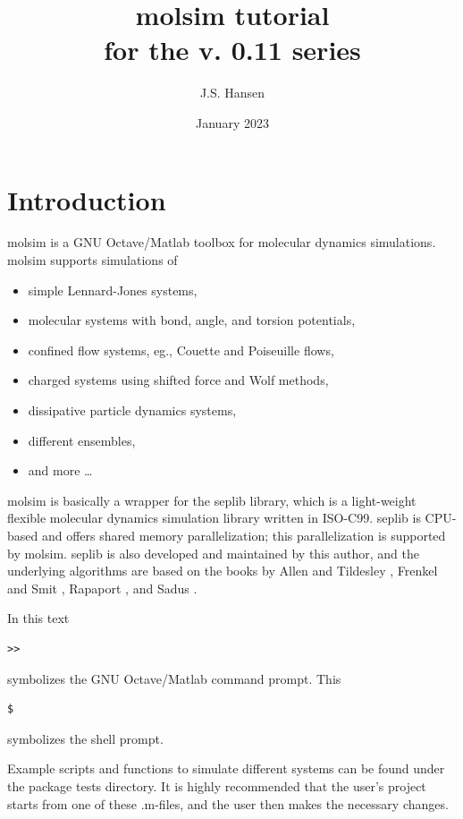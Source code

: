 \documentclass[11pt]{article}
\title{\textsf{molsim} tutorial \\ \bigskip \tiny{for the v. 0.11 series}}
\author{J.S. Hansen}
\date{January 2023}
\begin{document}
\maketitle

\section{Introduction}

\textsf{molsim} is a GNU Octave/Matlab toolbox for molecular dynamics
simulations. \textsf{molsim} supports simulations of
\begin{itemize}
\item simple Lennard-Jones systems,
\item molecular systems with bond, angle, and torsion potentials, 
\item confined flow systems, eg., Couette and Poiseuille flows,
\item charged systems using shifted force and Wolf methods,
\item dissipative particle dynamics systems,
\item different ensembles, 
\item and more \ldots
\end{itemize}

\bigskip
\noindent \textsf{molsim} is basically a wrapper for the \textsf{seplib}
library, which is a light-weight flexible molecular dynamics simulation library
written in ISO-C99. \textsf{seplib} is CPU-based and offers shared memory
parallelization; this parallelization is supported by
\textsf{molsim}. \textsf{seplib} is also developed and 
maintained by this
author, and the underlying algorithms are based on the books by Allen and
Tildesley \cite{AllenTildesley}, Frenkel and Smit \cite{FrenkelSmit}, Rapaport
\cite{Rapaport}, and Sadus \cite{Sadus}.

\bigskip
\noindent In this text
\begin{verbatim}
>> 
\end{verbatim}
symbolizes the GNU Octave/Matlab command prompt. This 
\begin{verbatim}
$ 
\end{verbatim}
symbolizes the shell prompt.

\bigskip
\noindent Example scripts and functions to simulate different systems can be
found under the package \textsf{tests} directory. It is highly recommended that
the user's project starts from one of these \textsf{.m}-files, and the user
then makes the necessary changes.  
\end{document}
